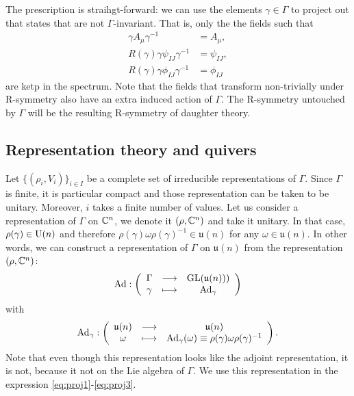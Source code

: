 \documentclass[a4paper,11pt]{article}
\begin{document}
    The prescription is straihgt-forward: we can use the elements $\gamma\in\Gamma$ to project out that states that are not $\Gamma$-invariant. That is, only the the fields such that
    \begin{align}
        \gamma A_\mu \gamma^{-1} &= A_\mu,\label{eq:proj1}\\
        R(\gamma)\gamma \psi_{IJ} \gamma^{-1} &= \psi_{IJ}\label{eq:proj2},\\
        R(\gamma)\gamma \phi_{IJ} \gamma^{-1} &= \phi_{IJ}\label{eq:proj3}
    \end{align}
    are ketp in the spectrum. Note that the fields that transform non-trivially under R-symmetry also have an extra induced action of $\Gamma$. The R-symmetry untouched by $\Gamma$ will be the resulting R-symmetry of daughter theory.

    \subsection{Representation theory and quivers}

        Let $\{(\rho_i,V_i)\}_{i\in I}$ be a complete set of irreducible representations of $\Gamma$. Since $\Gamma$ is finite, it is particular compact and those representation can be taken to be unitary. Moreover, $i$ takes a finite number of values. Let us consider a representation of $\Gamma$ on $\mathbb{C}^n$, we denote it $(\rho,\mathbb{C}^n)$ and take it unitary. In that case, $\rho(\gamma)\in\text{U}(n)$ and therefore $\rho(\gamma)\omega\rho(\gamma)^{-1}\in\mathfrak{u}(n)$ for any $\omega\in\mathfrak{u}(n)$. In other words, we can construct a representation of $\Gamma$ on $\mathfrak{u}(n)$ from the representation $(\rho,\mathbb{C}^n)$:
        \begin{equation}
            \text{Ad}:\left(
            \begin{array}{ccc}
                \Gamma & \longrightarrow & \text{GL}(\mathfrak{u}(n))) \\
                \gamma & \longmapsto & \text{Ad}_\gamma
            \end{array}
            \right)
        \end{equation}
        with
        \begin{equation}
            \text{Ad}_\gamma:\left(
            \begin{array}{ccc}
                \mathfrak{u}(n) & \longrightarrow & \mathfrak{u}(n) \\
                \omega & \longmapsto & \text{Ad}_\gamma(\omega)\equiv\rho(\gamma)\omega\rho(\gamma)^{-1}
            \end{array}
            \right).
        \end{equation}
        Note that even though this representation looks like the adjoint representation, it is not, because it not on the Lie algebra of $\Gamma$. We use this representation in the expression \eqref{eq:proj1}-\eqref{eq:proj3}.
\end{document}

